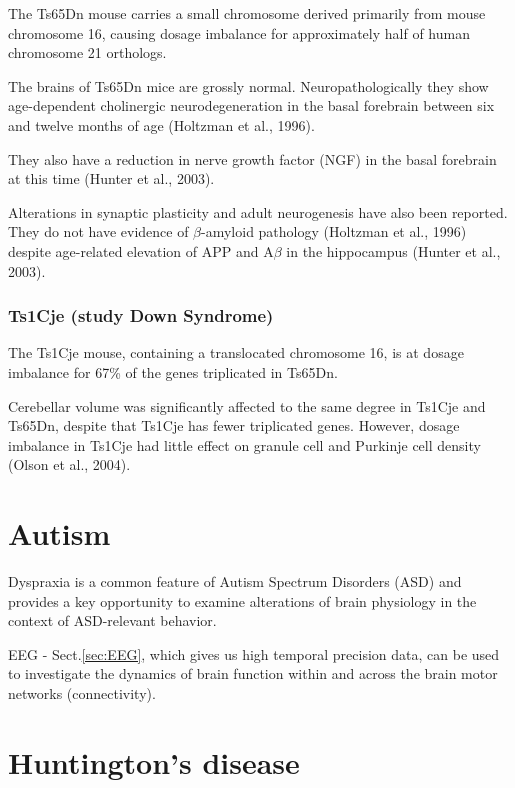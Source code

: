 The Ts65Dn mouse carries a small chromosome derived primarily from mouse
chromosome 16, causing dosage imbalance for approximately half of human
chromosome 21 orthologs. 

The brains of Ts65Dn mice are grossly normal. Neuropathologically they show
age-dependent cholinergic neurodegeneration in the basal forebrain between six
and twelve months of age (Holtzman et al., 1996).  

They also have a reduction in nerve growth factor (NGF) in the basal forebrain
at this time (Hunter et al., 2003).

Alterations in synaptic plasticity and adult neurogenesis have also been
reported. They do not have evidence of $\beta$-amyloid pathology (Holtzman et
al., 1996) despite age-related elevation of APP and A$\beta$ in the hippocampus
(Hunter et al., 2003).

\subsection{Ts1Cje (study Down Syndrome)}
\label{sec:Ts1Cje}

The Ts1Cje mouse, containing a translocated chromosome 16, is at dosage
imbalance for 67\% of the genes triplicated in Ts65Dn. 

Cerebellar volume was significantly affected to the same degree in Ts1Cje and
Ts65Dn, despite that Ts1Cje has fewer triplicated genes. 
However, dosage imbalance in Ts1Cje had little effect on granule cell and
Purkinje cell density (Olson et al., 2004). 

\chapter{Autism}


Dyspraxia is a common feature of Autism Spectrum Disorders (ASD) and provides a
key opportunity to examine alterations of brain physiology in the context of
ASD-relevant behavior.

EEG - Sect.\ref{sec:EEG}, which gives us high temporal precision data, can be
used to investigate the dynamics of brain function within and across the brain
motor networks (connectivity).



\chapter{Huntington's disease}

